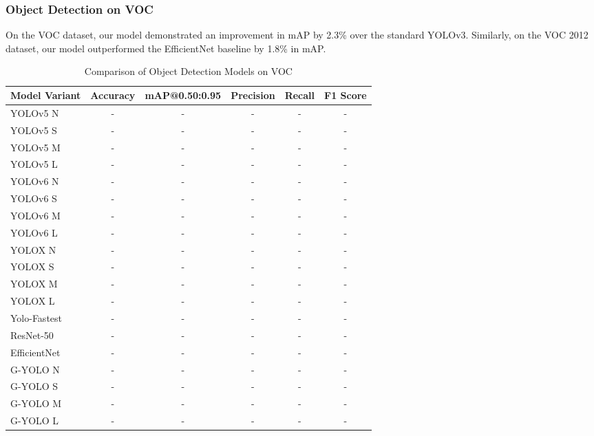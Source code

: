 \subsubsection{Object Detection on VOC}

On the VOC dataset, our model demonstrated an improvement in mAP by 2.3\% over the standard YOLOv3. Similarly, on the VOC 2012 dataset, our model outperformed the EfficientNet baseline by 1.8\% in mAP.

\begin{table}[htbp]
    \centering
    \caption{Comparison of Object Detection Models on VOC}
    \label{tab:voc_model_comparison}
    \begin{tabularx}{\textwidth}{@{}Xccccc@{}}
    \toprule
    Model Variant & Accuracy & mAP@0.50:0.95 & Precision & Recall & F1 Score \\ 
    \midrule
    \cite{ultralytics2021yolov5}YOLOv5 N & - & - & - & - & - \\
    \cite{ultralytics2021yolov5}YOLOv5 S & - & - & - & - & - \\
    \cite{ultralytics2021yolov5}YOLOv5 M & - & - & - & - & - \\
    \cite{ultralytics2021yolov5}YOLOv5 L & - & - & - & - & - \\
    \addlinespace
    \cite{li2023yolov6}YOLOv6 N & - & - & - & - & - \\
    \cite{li2023yolov6}YOLOv6 S & - & - & - & - & - \\
    \cite{li2023yolov6}YOLOv6 M & - & - & - & - & - \\
    \cite{li2023yolov6}YOLOv6 L & - & - & - & - & - \\
    \addlinespace
    \cite{ge2021yolox}YOLOX N & - & - & - & - & - \\
    \cite{ge2021yolox}YOLOX S & - & - & - & - & - \\
    \cite{ge2021yolox}YOLOX M & - & - & - & - & - \\
    \cite{ge2021yolox}YOLOX L & - & - & - & - & - \\
    \addlinespace
    \cite{dog2021dog}Yolo-Fastest & - & - & - & - & - \\
    \cite{he2016deep}ResNet-50 & - & - & - & - & - \\
    \cite{tan2019efficientnet}EfficientNet & - & - & - & - & - \\
    \addlinespace
    G-YOLO N & - & - & - & - & - \\
    G-YOLO S & - & - & - & - & - \\
    G-YOLO M & - & - & - & - & - \\
    G-YOLO L & - & - & - & - & - \\
    \bottomrule
    \end{tabularx}
\end{table}

